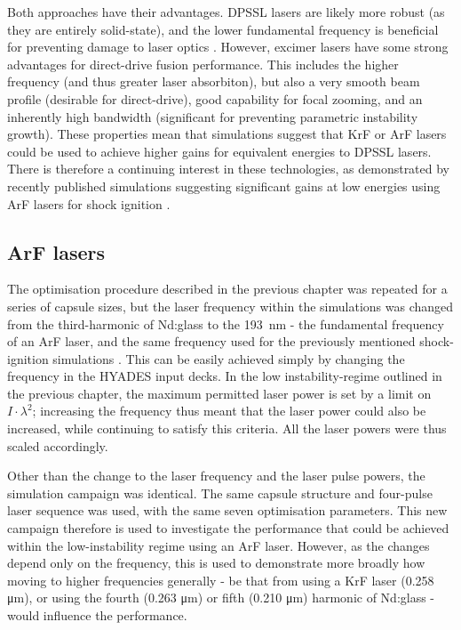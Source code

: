 Both approaches have their advantages. DPSSL lasers are likely more robust (as they are entirely solid-state), and the lower fundamental frequency is beneficial for preventing damage to laser optics \cite{Sethian2010}. However, excimer lasers have some strong advantages for direct-drive fusion performance. This includes the higher frequency (and thus greater laser absorbiton), but also a very smooth beam profile (desirable for direct-drive), good capability for focal zooming, and an inherently high bandwidth (significant for preventing parametric instability growth). These properties mean that simulations suggest that KrF or ArF lasers could be used to achieve higher gains for equivalent energies to DPSSL lasers. There is therefore a continuing interest in these technologies, as demonstrated by recently published simulations suggesting significant gains at low energies using ArF lasers for shock ignition \cite{Obenschain2020}.

\subsection{ArF lasers}

The optimisation procedure described in the previous chapter was repeated for a series of capsule sizes, but the laser frequency within the simulations was changed from the third-harmonic of Nd:glass to the 193~nm - the fundamental frequency of an ArF laser, and the same frequency used for the previously mentioned shock-ignition simulations \cite{Obenschain2020}. This can be easily achieved simply by changing the frequency in the HYADES input decks. In the low instability-regime outlined in the previous chapter, the maximum permitted laser power is set by a limit on $I \cdot \lambda^2$; increasing the frequency thus meant that the laser power could also be increased, while continuing to satisfy this criteria. All the laser powers were thus scaled accordingly. 

Other than the change to the laser frequency and the laser pulse powers, the simulation campaign was identical. The same capsule structure and four-pulse laser sequence was used, with the same seven optimisation parameters. This new campaign therefore is used to investigate the performance that could be achieved within the low-instability regime using an ArF laser. However, as the changes depend only on the frequency, this is used to demonstrate more broadly how moving to higher frequencies generally - be that from using a KrF laser (0.258 \unit{\micro\meter}), or using the fourth (0.263 \unit{\micro\meter}) or fifth (0.210 \unit{\micro\meter}) harmonic of Nd:glass - would influence the performance.

